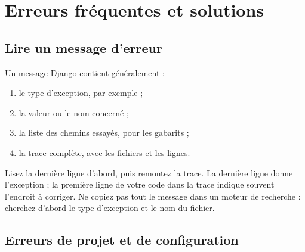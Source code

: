 \chapter{Erreurs fréquentes et solutions}
\label{ann:erreurs}


\section{Lire un message d'erreur}

Un message Django contient généralement :
\begin{enumerate}
  \item le type d'exception, par exemple  ;
  \item la valeur ou le nom concerné ;
  \item la liste des chemins essayés, pour les gabarits ;
  \item la trace complète, avec les fichiers et les lignes.
\end{enumerate}

\begin{bonne}
Lisez la dernière ligne d'abord, puis remontez la trace. La dernière ligne donne
l'exception ; la première ligne de votre code dans la trace indique souvent
l'endroit à corriger. Ne copiez pas tout le message dans un moteur de recherche :
cherchez d'abord le type d'exception et le nom du fichier.
\end{bonne}

\section{Erreurs de projet et de configuration}

